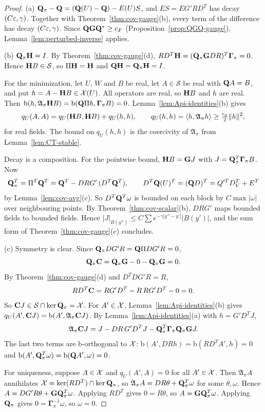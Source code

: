 \begin{proof}
(a) $\mathbf Q_\pi-\mathbf Q=(\mathbf Q(U)-\mathbf Q)-E(U)S$, and $ES=EG'RD^T$ has decay $(C\varepsilon,\gamma)$. Together with Theorem~\ref{thm:cov-gauge}(b), every term of the difference has decay $(C\varepsilon,\gamma)$. Since $\mathbf Q\mathbf G\mathbf Q^*\ge c_F$ (Proposition~\ref{prop:QGQ-gauge}), Lemma~\ref{lem:perturbed-inverse} applies.

(b) $\mathbf Q_\pi\mathbf H=I$. By Theorem~\ref{thm:cov-gauge}(d), $RD^T\mathbf H=(\mathbf Q_\pi\mathbf G DR)^T\boldsymbol\Gamma_\pi=0$. Hence $\mathbf H B\in\mathcal S$, so $\Pi\mathbf H=\mathbf H$ and $\mathbf Q\mathbf H=\mathbf Q_\pi\mathbf H=I$.

For the minimization, let $U$, $W$ and $B$ be real, let $A\in\mathcal S$ be real with $\mathbf Q A=B$, and put $h=A-\mathbf H B\in\mathcal X(U)$. All operators are real, so $\mathbf H B$ and $h$ are real. Then $\mathrm b(h,\mathfrak A_\pi\mathbf H B)=\mathrm b(\mathbf Q\Pi h,\boldsymbol\Gamma_\pi B)=0$. Lemma~\ref{lem:Api-identities}(b) gives
\[
q_U(A,A)=q_U(\mathbf H B,\mathbf H B)+q_U(h,h),\qquad q_U(h,h)=\langle h,\mathfrak A_\pi h\rangle\ge\tfrac{c_g}2\|h\|^2 ,
\]
for real fields. The bound on $q_U(h,h)$ is the coercivity of $\mathfrak A_\pi$ from Lemma~\ref{lem:CT-stable}.

Decay is a composition. For the pointwise bound, $\mathbf H B=\mathbf G J$ with $J=\mathbf Q_\pi^T\boldsymbol\Gamma_\pi B$. Now
\[
\mathbf Q_\pi^T=\Pi^T\mathbf Q^T=\mathbf Q^T-DRG'\,(D^T\mathbf Q^T),\qquad D^T\mathbf Q(U)^T=(\mathbf Q D)^T=Q'^TD_V^T+E^T
\]
by Lemma~\ref{lem:cov-avg}(c). So $D^T\mathbf Q^T\omega$ is bounded on each block by $C\max|\omega|$ over neighbouring points. By Theorem~\ref{thm:cov-scalar}(b), $DRG'$ maps bounded fields to bounded fields. Hence $|J|_{B(y'')}\le C\sum e^{-\gamma|y''-y'|}|B(y')|$, and the sum form of Theorem~\ref{thm:cov-gauge}(c) concludes.

(c) Symmetry is clear. Since $\mathbf Q_\pi DG'R=\mathbf Q\Pi DG'R=0$,
\[
\mathbf Q_\pi\mathbf C=\mathbf Q_\pi\mathbf G-0-\mathbf Q_\pi\mathbf G=0 .
\]
By Theorem~\ref{thm:cov-gauge}(d) and $D^TDG'R=R$,
\[
RD^T\mathbf C=RG'D^T-R\,RG'D^T-0=0 .
\]
So $\mathbf C J\in\mathcal S\cap\ker\mathbf Q_\pi=\mathcal X$. For $A'\in\mathcal X$, Lemma~\ref{lem:Api-identities}(b) gives $q_U(A',\mathbf C J)=\mathrm b(A',\mathfrak A_\pi\mathbf C J)$. By Lemma~\ref{lem:Api-identities}(a) with $h=G'D^TJ$,
\[
\mathfrak A_\pi\mathbf C J=J-DR\,G'D^TJ-\mathbf Q_\pi^T\boldsymbol\Gamma_\pi\mathbf Q_\pi\mathbf G J .
\]
The last two terms are $\mathrm b$-orthogonal to $\mathcal X$: $\mathrm b(A',DRh)=\mathrm b(RD^TA',h)=0$ and $\mathrm b(A',\mathbf Q_\pi^T\omega)=\mathrm b(\mathbf Q A',\omega)=0$.

For uniqueness, suppose $A\in\mathcal X$ and $q_U(A',A)=0$ for all $A'\in\mathcal X$. Then $\mathfrak A_\pi A$ annihilates $\mathcal X=\ker(RD^T)\cap\ker\mathbf Q_\pi$, so $\mathfrak A_\pi A=DR\theta+\mathbf Q_\pi^T\omega$ for some $\theta,\omega$. Hence $A=DG'R\theta+\mathbf G\mathbf Q_\pi^T\omega$. Applying $RD^T$ gives $0=R\theta$, so $A=\mathbf G\mathbf Q_\pi^T\omega$. Applying $\mathbf Q_\pi$ gives $0=\boldsymbol\Gamma_\pi^{-1}\omega$, so $\omega=0$.


\end{proof}
